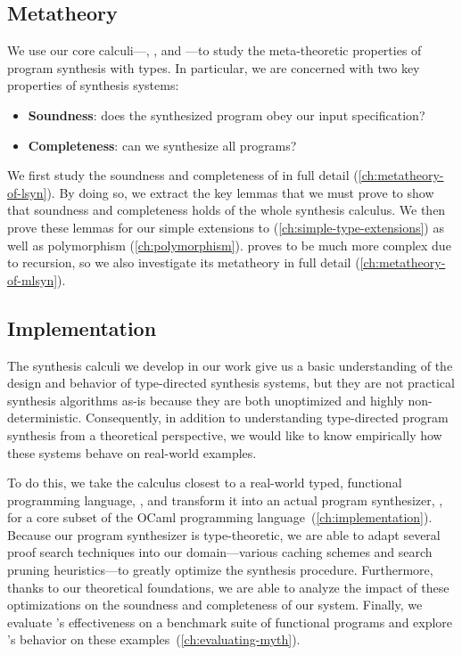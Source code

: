 \subsection{Metatheory}
We use our core calculi---\lsyn{}, \mlsyn{}, and \systemfsyn{}---to study the meta-theoretic properties of program synthesis with types.
In particular, we are concerned with two key properties of synthesis systems:
\begin{itemize}
  \item \textbf{Soundness}: does the synthesized program obey our input specification?
  \item \textbf{Completeness}: can we synthesize all programs?
\end{itemize}
We first study the soundness and completeness of \lsyn{} in full detail (\autoref{ch:metatheory-of-lsyn}).
By doing so, we extract the key lemmas that we must prove to show that soundness and completeness holds of the whole synthesis calculus.
We then prove these lemmas for our simple extensions to \lsyn{} (\autoref{ch:simple-type-extensions}) as well as polymorphism (\autoref{ch:polymorphism}).
\mlsyn{} proves to be much more complex due to recursion, so we also investigate its metatheory in full detail (\autoref{ch:metatheory-of-mlsyn}).

\subsection{Implementation}
The synthesis calculi we develop in our work give us a basic understanding of the design and behavior of type-directed synthesis systems, but they are not practical synthesis algorithms as-is because they are both unoptimized and highly non-deterministic.
Consequently, in addition to understanding type-directed program synthesis from a theoretical perspective, we would like to know empirically how these systems behave on real-world examples.

To do this, we take the calculus closest to a real-world typed, functional programming language, \mlsyn{}, and transform it into an actual program synthesizer, \myth{}, for a core subset of the OCaml programming language~(\autoref{ch:implementation}).
Because our program synthesizer is type-theoretic, we are able to adapt several proof search techniques into our domain---various caching schemes and search pruning heuristics---to greatly optimize the synthesis procedure.
Furthermore, thanks to our theoretical foundations, we are able to analyze the impact of these optimizations on the soundness and completeness of our system.
Finally, we evaluate \myth{}'s effectiveness on a benchmark suite of functional programs and explore \myth{}'s behavior on these examples~(\autoref{ch:evaluating-myth}).

